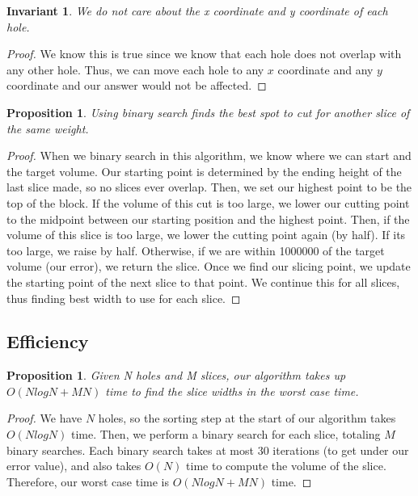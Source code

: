 \documentclass[12pt]{article}
\newtheorem{invariant}[theorem]{Invariant}
\newtheorem{proposition}[theorem]{Proposition}
\begin{document}
\begin{invariant}
    We do not care about the x coordinate and y coordinate of
    each hole.
\end{invariant}

\begin{proof}
    We know this is true since we know that each hole does not
    overlap with any other hole. Thus, we can move each hole to
    any $x$ coordinate and any $y$ coordinate and our answer
    would not be affected.
\end{proof}

\begin{proposition}
    Using binary search finds the best spot to cut for another
    slice of the same weight.
\end{proposition}

\begin{proof}
    When we binary search in this algorithm, we know where we
    can start and the target volume. Our starting point is
    determined by the ending height of the last slice made,
    so no slices ever overlap. Then, we set our highest
    point to be the top of the block. If the volume of this
    cut is too large, we lower our cutting point to the midpoint
    between our starting position and the highest point. Then, if
    the volume of this slice is too large, we lower the cutting point
    again (by half). If its too large, we raise by half. Otherwise,
    if we are within 1000000 of the target volume (our error),
    we return the slice. Once we find our slicing point, we update
    the starting point of the next slice to that point. We continue
    this for all slices, thus finding best width to use for each
    slice.
\end{proof}

\subsection{Efficiency}

\begin{proposition}
    Given N holes and M slices, our algorithm takes up
    $O(NlogN + MN)$ time to find the slice widths in the
    worst case time.
\end{proposition}

\begin{proof}
    We have $N$ holes, so the sorting step at the start
    of our algorithm takes $O(NlogN)$ time. Then, we
    perform a binary search for each slice, totaling
    $M$ binary searches. Each binary search takes at
    most 30 iterations (to get under our error value),
    and also takes $O(N)$ time to compute the volume
    of the slice. Therefore, our worst case time is
    $O(NlogN + MN)$ time.
\end{proof}
\end{document}
